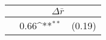 {
\def\sym#1{\ifmmode^{#1}\else\(^{#1}\)\fi}
\begin{tabular*}{3cm}{@{\hskip\tabcolsep\extracolsep\fill}l*{1}{lc}}
\toprule
                &\multicolumn{2}{c}{$\Delta\bar{r}$}\\
\midrule
                &     0.66\sym{**} &   (0.19)\\
\bottomrule
\end{tabular*}
}
